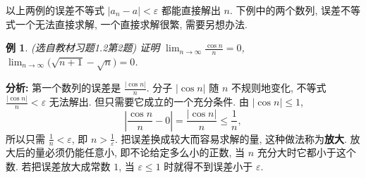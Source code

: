 \documentclass[UTF8,openany]{ctexbook}
\theoremstyle{chinesetextbook}
\newtheorem{example}{例}[section]
\begin{document}
以上两例的误差不等式 $|a_n-a|<\varepsilon$ 都能直接解出 $n$. 下例中的两个数列, 误差不等式一个无法直接求解, 一个直接求解很繁, 需要另想办法.
\begin{example}\label{ex:h12-2}
\textnormal{(选自教材习题1.2第2题)} 证明 $\displaystyle\lim_{n\to\infty}\frac{\cos n}n=0$, $\displaystyle\lim_{n\to\infty}\bigl(\sqrt{n+1}-\sqrt n\bigr)=0$.
\end{example}
\par\indent\textbf{分析:} 第一个数列的误差是 $\displaystyle\frac{|\cos n|}n$. 分子 $|\cos n|$ 随 $n$ 不规则地变化, 不等式 $\displaystyle\frac{|\cos n|}n<\varepsilon$ 无法解出. 但只需要它成立的一个充分条件. 由 $|\cos n|\le1$,
\[
\left|\frac{\cos n}n-0\right|=\frac{|\cos n|}n\le\frac1n,
\]
所以只需 $\displaystyle\frac1n<\varepsilon$, 即 $\displaystyle n>\frac1\varepsilon$. 把误差换成较大而容易求解的量, 这种做法称为\textbf{放大}. 放大后的量必须仍能任意小, 即不论给定多么小的正数, 当 $n$ 充分大时它都小于这个数. 若把误差放大成常数 $1$, 当 $\varepsilon\le1$ 时就得不到误差小于 $\varepsilon$.
\end{document}
